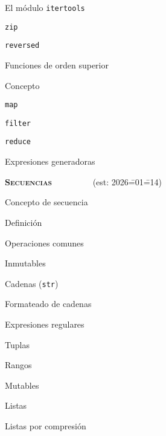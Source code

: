 \begin{longenum}
\begin{longenum}
\begin{longenum}
\begin{longenum}
                \item El módulo \texttt{itertools}
                \item \texttt{zip}
                \item \texttt{reversed}
            \end{longenum}
        \end{longenum}
        \item Funciones de orden superior
        \begin{longenum}
            \item Concepto
            \item \texttt{map}
            \item \texttt{filter}
            \item \texttt{reduce}
            \item Expresiones generadoras
        \end{longenum}
    \end{longenum}
    \item \textbf{\textsc{Secuencias}} \ \ \ \ \ \ \ \ \ (est: 2026\==01\==14)
    \begin{longenum}
        \item Concepto de secuencia
        \begin{longenum}
            \item Definición
            \item Operaciones comunes
        \end{longenum}
        \item Inmutables
        \begin{longenum}
            \item Cadenas (\texttt{str})
            \begin{longenum}
                \item Formateado de cadenas
                \item Expresiones regulares
            \end{longenum}
            \item Tuplas
            \item Rangos
        \end{longenum}
        \item Mutables
        \begin{longenum}
            \item Listas
            \begin{longenum}
                \item Listas por compresión

\end{longenum}
\end{longenum}
\end{longenum}
\end{longenum}
